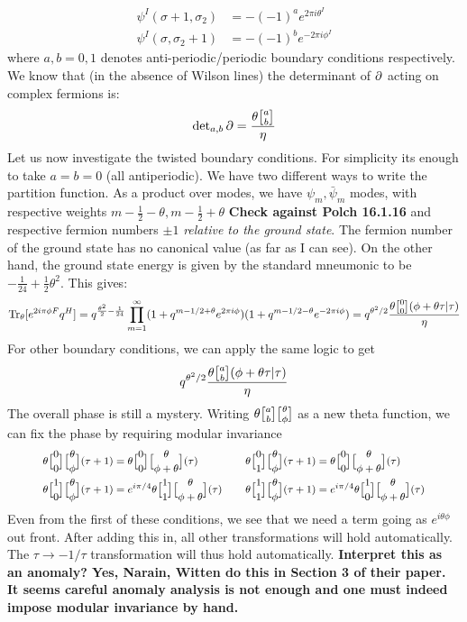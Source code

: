 \documentclass[11pt, class=article, crop=false]{standalone}
\begin{document}
\begin{enumerate}
		\[
		\begin{aligned}
			\psi^I (\sigma + 1, \sigma_2) &= -(-1)^{a} e^{2 \pi i \theta^I} \\
			\psi^I (\sigma, \sigma_2 + 1) &= -(-1)^{b} e^{-2\pi i \phi^I}
		\end{aligned}
		\]
		where $a,b = 0,1$ denotes anti-periodic/periodic boundary conditions respectively. We know that (in the absence of Wilson lines) the determinant of $\partial$ acting on complex fermions is:
		\[
			\text{det}_{a,b}\, \d = \frac{\theta \twist{a}{b}}{\eta}
		\]
		Let us now investigate the twisted boundary conditions. For simplicity its enough to take $a= b = 0$ (all antiperiodic). We have two different ways to write the partition function. As a product over modes, we have $\psi_m, \bar \psi_m$ modes, with respective weights $m-\frac12 -\theta, m-\frac12+\theta$ \textbf{Check against Polch 16.1.16} and respective fermion numbers $\pm1$ \emph{relative to the ground state}. The fermion number of the ground state has no canonical value (as far as I can see). On the other hand, the ground state energy is given by the standard mneumonic to be $-\frac{1}{24} + \frac12 \theta^2$. This gives:
		\[
			\Tr_{\theta} [e^{2 i \pi \phi F} q^{H}] = q^{\frac{\theta^2}{2} - \frac{1}{24}} \prod_{m=1}^\infty (1 + q^{m -1/2 + \theta} e^{2\pi i \phi}) (1 + q^{m -1/2 - \theta} e^{-2\pi i \phi}) = q^{\theta^2/2}\frac{\theta\twist00 (\phi + \theta \tau | \tau)}{\eta}
		\]
		For other boundary conditions, we can apply the same logic to get 
		\[
			q^{\theta^2/2} \frac{\theta \twist a b (\phi + \theta \tau | \tau)}{\eta}
		\]
		The overall phase is still a mystery. Writing $\theta \twist a b \twist \theta \phi$ as a new theta function, we can fix the phase by requiring modular invariance 
		\begin{equation}\label{eq:thetaproperties}
			\footnotesize
		\begin{aligned}
			\theta \twist 0 0 \twist \theta \phi (\tau+1) &= \theta \twist 0 0 \twist{\theta}{\phi+\theta} (\tau)
			&\quad&
			 \theta \twist 0 1 \twist \theta \phi (\tau+1) = \theta \twist 0 0 \twist{\theta}{\phi+\theta}(\tau)\\
			 \theta \twist10 \twist \theta \phi (\tau+1) &= e^{i \pi /4} \theta \twist11 \twist{\theta}{\phi+\theta}(\tau)
			 &\quad&
			 \theta \twist11 \twist \theta \phi (\tau+1) = e^{i\pi/4} \theta \twist10 \twist{\theta}{\phi+\theta}(\tau)
		\end{aligned}
		\end{equation}
		Even from the first of these conditions, we see that we need a term going as $e^{i \theta \phi}$ out front. After adding this in, all other transformations will hold automatically. The $\tau \to -1/\tau$ transformation will thus hold automatically. \textbf{Interpret this as an anomaly? Yes, Narain, Witten do this in Section 3 of their paper. It seems careful anomaly analysis is not enough and one must indeed impose modular invariance by hand.} 
		

\end{enumerate}
\end{document}
